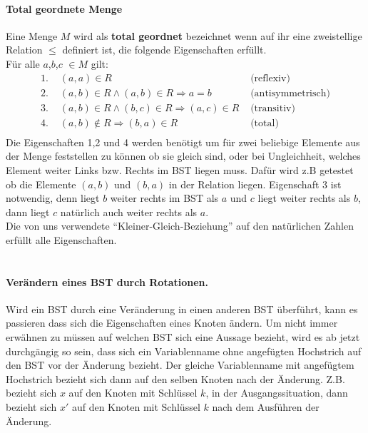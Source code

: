 \documentclass[a4paper,12pt]{article}
\begin{document}
\paragraph{Total geordnete Menge} 
Eine Menge $M$ wird als \textbf{total geordnet} bezeichnet wenn auf ihr eine zweistellige Relation $\leq$ definiert ist, die folgende Eigenschaften erfüllt.\\
Für alle $a$,$b$,$c$ $\in M$ gilt:
\begin{align*}
\text{1. } & (a,a) \in R  &\text{  (reflexiv)}\\
\text{2. } & (a,b) \in R  \land  (a,b) \in R \Rightarrow a = b  &\text{  (antisymmetrisch)}\\
\text{3. } & (a,b) \in R  \land  (b,c) \in R \Rightarrow  (a,c) \in R  &\text{  (transitiv)}\\
\text{4. } & (a,b) \notin R \Rightarrow  (b,a) \in R   &\text{  (total)}\\
\end{align*}
Die Eigenschaften 1,2 und 4 werden benötigt um für zwei beliebige Elemente aus der Menge feststellen zu können ob sie gleich sind, oder bei Ungleichheit, welches Element weiter Links bzw. Rechts im BST liegen muss. Dafür wird z.B getestet ob die Elemente $(a,b)$ und $(b, a)$ in der Relation liegen. Eigenschaft 3 ist notwendig, denn liegt $b$ weiter rechts im BST als $a$ und $c$ liegt weiter rechts als $b$, dann liegt $c$ natürlich auch weiter rechts als $a$. \\
Die von uns verwendete \enquote{Kleiner-Gleich-Beziehung} auf den natürlichen Zahlen erfüllt alle Eigenschaften.
\\
\\




\paragraph{Verändern eines BST durch Rotationen.}
Wird ein BST durch eine Veränderung in einen anderen BST überführt, kann es passieren dass sich die Eigenschaften eines Knoten ändern. Um nicht immer erwähnen zu müssen auf welchen BST sich eine Aussage bezieht, wird es ab jetzt durchgängig so sein, dass sich ein Variablenname ohne angefügten Hochstrich auf den BST vor der Änderung bezieht. Der gleiche Variablenname mit angefügtem Hochstrich bezieht sich dann auf den selben Knoten nach der Änderung. Z.B. bezieht sich $x$ auf den Knoten mit Schlüssel $k$, in der Ausgangssituation, dann bezieht sich $x'$ auf den Knoten mit Schlüssel $k$ nach dem Ausführen der Änderung. \\
\end{document}
